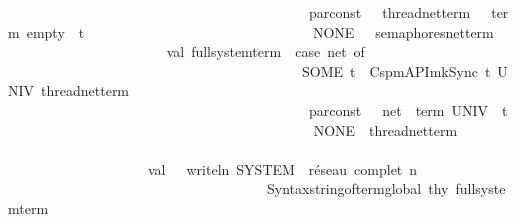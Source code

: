 \begin{isabellebody}
\ \ \ \ \ \ \ \ \ \ \ \ \ \ \ \ \ \ \ \ \ \ \ \ \ \ \ \ \ \ \ \ \ \ \ \ \ \ \ \ \ \ {\isacharparenleft}{\kern0pt}{\isacharasterisk}{\kern0pt}\ par{\isacharunderscore}{\kern0pt}const\ \ {\isachardollar}{\kern0pt}\ thread{\isacharunderscore}{\kern0pt}net{\isacharunderscore}{\kern0pt}term\ \ {\isachardollar}{\kern0pt}\ {\isacharat}{\kern0pt}{\isacharbraceleft}{\kern0pt}term\ empty{\isacharbraceright}{\kern0pt}\ \ {\isachardollar}{\kern0pt}t\ {\isacharasterisk}{\kern0pt}{\isacharparenright}{\kern0pt}\isanewline
\ \ \ \ \ \ \ \ \ \ \ \ \ \ \ \ \ \ \ \ \ \ \ \ \ \ \ \ \ \ \ {\isacharbar}{\kern0pt}NONE\ {\isacharequal}{\kern0pt}{\isachargreater}{\kern0pt}\ \ semaphores{\isacharunderscore}{\kern0pt}net{\isacharunderscore}{\kern0pt}term{\isacharparenright}{\kern0pt}\isanewline
\ \ \isanewline
\ \ \ \ \ \ \ \ \ \ \ \ \ \ \ \ \ \ \ \ val\ full{\isacharunderscore}{\kern0pt}system{\isacharunderscore}{\kern0pt}term\ {\isacharequal}{\kern0pt}\ {\isacharparenleft}{\kern0pt}case\ net{}\ of\isanewline
\ \ \ \ \ \ \ \ \ \ \ \ \ \ \ \ \ \ \ \ \ \ \ \ \ \ \ \ \ \ \ \ \ \ \ \ \ \ \ \ \ \ SOME\ t\ {\isacharequal}{\kern0pt}{\isachargreater}{\kern0pt}\ Cspm{\isacharunderscore}{\kern0pt}API{\isachardot}{\kern0pt}mk{\isacharunderscore}{\kern0pt}Sync\ t\ UNIV{\isacharunderscore}{\kern0pt}\ thread{\isacharunderscore}{\kern0pt}net{\isacharunderscore}{\kern0pt}term\isanewline
\ \ \ \ \ \ \ \ \ \ \ \ \ \ \ \ \ \ \ \ \ \ \ \ \ \ \ \ \ \ \ \ \ \ \ \ \ \ \ \ \ \ {\isacharparenleft}{\kern0pt}{\isacharasterisk}{\kern0pt}\ par{\isacharunderscore}{\kern0pt}const\ \ {\isachardollar}{\kern0pt}\ net{}\ {\isachardollar}{\kern0pt}\ {\isacharat}{\kern0pt}{\isacharbraceleft}{\kern0pt}term\ UNIV{\isacharbraceright}{\kern0pt}\ {\isachardollar}{\kern0pt}\ {\isacharparenleft}{\kern0pt}t{\isacharparenright}{\kern0pt}\ {\isacharasterisk}{\kern0pt}{\isacharparenright}{\kern0pt}\isanewline
\ \ \ \ \ \ \ \ \ \ \ \ \ \ \ \ \ \ \ \ \ \ \ \ \ \ \ \ \ \ \ \ \ \ \ \ \ \ \ \ \ \ {\isacharbar}{\kern0pt}NONE\ {\isacharequal}{\kern0pt}{\isachargreater}{\kern0pt}\ thread{\isacharunderscore}{\kern0pt}net{\isacharunderscore}{\kern0pt}term{\isacharparenright}{\kern0pt}\isanewline
\ \ \ \ \ \ \ \ \ \ \isanewline
\ \ \ \ \ \ \ \ \ \ \ \ \ \ \ \ \ \ \ \ val\ {\isacharunderscore}{\kern0pt}\ {\isacharequal}{\kern0pt}\ writeln\ {\isacharparenleft}{\kern0pt}{\isachardoublequote}{\kern0pt}{\isacharbrackleft}{\kern0pt}SYSTEM{\isacharbrackright}{\kern0pt}\ \ réseau\ complet\ {\isacharcolon}{\kern0pt}{\isacharbackslash}{\kern0pt}n\ \ {\isachardoublequote}{\kern0pt}\ {\isacharcircum}{\kern0pt}\isanewline
\ \ \ \ \ \ \ \ \ \ \ \ \ \ \ \ \ \ \ \ \ \ \ \ \ \ \ \ \ \ \ \ \ \ \ \ \ Syntax{\isachardot}{\kern0pt}string{\isacharunderscore}{\kern0pt}of{\isacharunderscore}{\kern0pt}term{\isacharunderscore}{\kern0pt}global\ thy{\isacharprime}{\kern0pt}\ full{\isacharunderscore}{\kern0pt}system{\isacharunderscore}{\kern0pt}term{\isacharparenright}{\kern0pt}\isanewline

\end{isabellebody}
